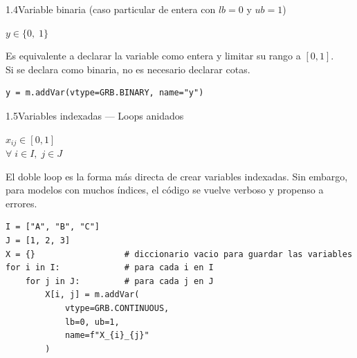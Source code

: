 \documentclass[10pt,a4paper]{article}
\newlength{\mathcolw}
\newlength{\codecolw}
\newcommand{\entryheader}[1]{%
  \needspace{5cm}%
  \vspace{6pt}%
  \noindent%
  \begin{tcolorbox}[
    colback=subsecbg!18,
    colframe=subsecbg!45,
    sharp corners, boxrule=0.4pt,
    left=5pt, right=5pt, top=2pt, bottom=2pt,
    fontupper=\small\bfseries\sffamily,
  ]
  #1
  \end{tcolorbox}%
  \vspace{2pt}%
}
\begin{document}
\entryheader{1.4\quad Variable binaria (caso particular de entera con $lb=0$ y $ub=1$)}
\noindent
\begin{minipage}[t]{\mathcolw}
    \begin{tcolorbox}[mathbox]
        $y \in \{0,\; 1\}$
    \end{tcolorbox}
    \vspace{2pt}
    \begin{tcolorbox}[notebox]
        Es equivalente a declarar la variable como entera y limitar su rango a $[0,1]$.\\
        Si se declara como binaria, no es necesario declarar cotas.
    \end{tcolorbox}
\end{minipage}\hspace{0.02\textwidth}%
\begin{minipage}[t]{\codecolw}
    \begin{lstlisting}[style=gurobipy]
y = m.addVar(vtype=GRB.BINARY, name="y")
\end{lstlisting}
\end{minipage}

\vspace{4pt}

\entryheader{1.5\quad Variables indexadas --- Loops anidados}
\noindent
\begin{minipage}[t]{\mathcolw}
    \begin{tcolorbox}[mathbox]
        $x_{ij} \in [0,1]$\\[4pt]
        $\forall\; i \in I,\; j \in J$
    \end{tcolorbox}
    \vspace{2pt}
    \begin{tcolorbox}[notebox]
        El doble loop es la forma m\'as directa de crear variables indexadas. Sin embargo, para modelos con muchos \'indices, el c\'odigo se vuelve verboso y propenso a errores.
    \end{tcolorbox}
\end{minipage}\hspace{0.02\textwidth}%
\begin{minipage}[t]{\codecolw}
    \begin{lstlisting}[style=gurobipy]
I = ["A", "B", "C"]
J = [1, 2, 3]
X = {}                  # diccionario vacio para guardar las variables
for i in I:             # para cada i en I
    for j in J:         # para cada j en J
        X[i, j] = m.addVar(
            vtype=GRB.CONTINUOUS,
            lb=0, ub=1,
            name=f"X_{i}_{j}"
        )
\end{lstlisting}
\end{minipage}
\end{document}
